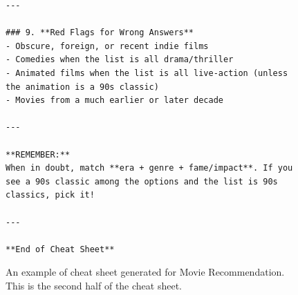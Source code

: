 \begin{figure}[t]
\begin{tcolorbox}[title=Cheat Sheet for Movie Recommendation (2/2), colback=gray!10, colframe=black!70, boxrule=0.5pt, top=0pt, bottom=0pt, left=0pt, right=0pt, arc=0.8mm, width=1.0\textwidth]
\begin{lstlisting}
---

### 9. **Red Flags for Wrong Answers**
- Obscure, foreign, or recent indie films
- Comedies when the list is all drama/thriller
- Animated films when the list is all live-action (unless the animation is a 90s classic)
- Movies from a much earlier or later decade

---

**REMEMBER:**  
When in doubt, match **era + genre + fame/impact**. If you see a 90s classic among the options and the list is 90s classics, pick it!

---

**End of Cheat Sheet**
\end{lstlisting}
\end{tcolorbox}
\caption{
An example of cheat sheet generated for Movie Recommendation.
This is the second half of the cheat sheet.
}
\label{fig:cheat_sheet_movie_2}
\end{figure}